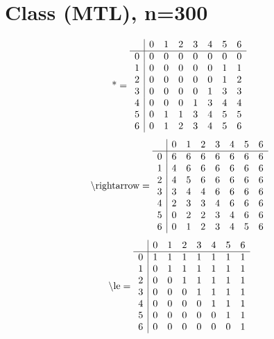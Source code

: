\documentclass[11pt]{article}
\begin{document}
\section{Class (MTL), n=300}
\[\text{*} = 
\begin{array}{r | r r r r r r r}
 & 0 & 1 & 2 & 3 & 4 & 5 & 6 \\ \hline
0 & 0 & 0 & 0 & 0 & 0 & 0 & 0 \\
1 & 0 & 0 & 0 & 0 & 0 & 1 & 1 \\
2 & 0 & 0 & 0 & 0 & 0 & 1 & 2 \\
3 & 0 & 0 & 0 & 0 & 1 & 3 & 3 \\
4 & 0 & 0 & 0 & 1 & 3 & 4 & 4 \\
5 & 0 & 1 & 1 & 3 & 4 & 5 & 5 \\
6 & 0 & 1 & 2 & 3 & 4 & 5 & 6 \\
\end{array}
\]
\[\text{\textbackslash rightarrow} = 
\begin{array}{r | r r r r r r r}
 & 0 & 1 & 2 & 3 & 4 & 5 & 6 \\ \hline
0 & 6 & 6 & 6 & 6 & 6 & 6 & 6 \\
1 & 4 & 6 & 6 & 6 & 6 & 6 & 6 \\
2 & 4 & 5 & 6 & 6 & 6 & 6 & 6 \\
3 & 3 & 4 & 4 & 6 & 6 & 6 & 6 \\
4 & 2 & 3 & 3 & 4 & 6 & 6 & 6 \\
5 & 0 & 2 & 2 & 3 & 4 & 6 & 6 \\
6 & 0 & 1 & 2 & 3 & 4 & 5 & 6 \\
\end{array}
\]
\[\text{\textbackslash le} = 
\begin{array}{r | r r r r r r r}
 & 0 & 1 & 2 & 3 & 4 & 5 & 6 \\ \hline
0 & 1 & 1 & 1 & 1 & 1 & 1 & 1 \\
1 & 0 & 1 & 1 & 1 & 1 & 1 & 1 \\
2 & 0 & 0 & 1 & 1 & 1 & 1 & 1 \\
3 & 0 & 0 & 0 & 1 & 1 & 1 & 1 \\
4 & 0 & 0 & 0 & 0 & 1 & 1 & 1 \\
5 & 0 & 0 & 0 & 0 & 0 & 1 & 1 \\
6 & 0 & 0 & 0 & 0 & 0 & 0 & 1 \\
\end{array}
\]
\end{document}
